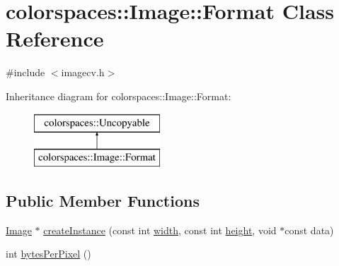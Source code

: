 \hypertarget{classcolorspaces_1_1_image_1_1_format}{}\section{colorspaces\+:\+:Image\+:\+:Format Class Reference}
\label{classcolorspaces_1_1_image_1_1_format}


{\ttfamily \#include $<$imagecv.\+h$>$}

Inheritance diagram for colorspaces\+:\+:Image\+:\+:Format\+:\begin{figure}[H]
\begin{center}
\leavevmode
\includegraphics[height=2.000000cm]{classcolorspaces_1_1_image_1_1_format}
\end{center}
\end{figure}
\subsection*{Public Member Functions}
\begin{DoxyCompactItemize}
\item 
\hyperlink{classcolorspaces_1_1_image}{Image} $\ast$ \hyperlink{classcolorspaces_1_1_image_1_1_format_acfd0aa30bcf044ff947f07c15478cc97}{create\+Instance} (const int \hyperlink{classcolorspaces_1_1_image_ab80af7d4797110c23ed575b329ec7c4f}{width}, const int \hyperlink{classcolorspaces_1_1_image_a99a05ebd37f61215b2c3042ecaefdbfc}{height}, void $\ast$const data)
\item 
int \hyperlink{classcolorspaces_1_1_image_1_1_format_a0ff066e47cb663980d8fe186994a4686}{bytes\+Per\+Pixel} ()
\end{DoxyCompactItemize}

